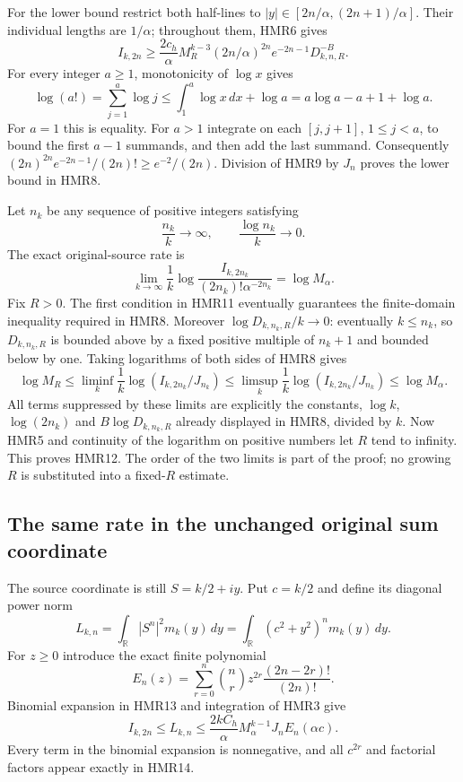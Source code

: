 \documentclass[11pt,a4paper]{article}
\begin{document}
For the lower bound restrict both half-lines to
$|y|\in[2n/\alpha,(2n+1)/\alpha]$. Their individual lengths
are $1/\alpha$; throughout them, HMR6 gives
\[
 I_{k,2n}\geq
 \frac{2c_h}{\alpha}M_R^{k-3}
       (2n/\alpha)^{2n}e^{-2n-1}D_{k,n,R}^{-B}.
 \tag{HMR9}
\]
For every integer $a\geq1$, monotonicity of $\log x$ gives
\[
 \log(a!)=\sum_{j=1}^a\log j
 \leq\int_1^a\log x\,dx+\log a
 =a\log a-a+1+\log a.
 \tag{HMR10}
\]
For $a=1$ this is equality. For $a>1$ integrate on each
$[j,j+1]$, $1\leq j<a$, to bound the first $a-1$
summands, and then add the last summand. Consequently
$(2n)^{2n}e^{-2n-1}/(2n)!\geq e^{-2}/(2n)$.
Division of HMR9 by $J_n$ proves the lower bound in HMR8.

Let $n_k$ be any sequence of positive integers satisfying
\[
 \frac{n_k}{k}\longrightarrow\infty,\qquad
 \frac{\log n_k}{k}\longrightarrow0.
 \tag{HMR11}
\]
The exact original-source rate is
\[
 \boxed{\displaystyle
 \lim_{k\to\infty}\frac1k
 \log\frac{I_{k,2n_k}}{(2n_k)!\alpha^{-2n_k}}
 =\log M_\alpha.}
 \tag{HMR12}
\]
Fix $R>0$. The first condition in HMR11 eventually guarantees
the finite-domain inequality required in HMR8.
Moreover $\log D_{k,n_k,R}/k\to0$: eventually $k\leq n_k$,
so $D_{k,n_k,R}$ is bounded above by a fixed positive
multiple of $n_k+1$ and bounded below by one.
Taking logarithms of both sides of HMR8 gives
\[
 \log M_R\leq
 \liminf_k\frac1k\log(I_{k,2n_k}/J_{n_k})
 \leq\limsup_k\frac1k\log(I_{k,2n_k}/J_{n_k})
 \leq\log M_\alpha.
\]
All terms suppressed by these limits are explicitly the
constants, $\log k$, $\log(2n_k)$ and $B\log D_{k,n_k,R}$
already displayed in HMR8, divided by $k$.
Now HMR5 and continuity of the logarithm on positive numbers
let $R$ tend to infinity. This proves HMR12. The order of the
two limits is part of the proof; no growing $R$ is substituted
into a fixed-$R$ estimate.

\subsection{The same rate in the unchanged original sum coordinate}

The source coordinate is still $S=k/2+iy$. Put $c=k/2$ and
define its diagonal power norm
\[
 L_{k,n}=\int_{\mathbb R}|S^n|^2m_k(y)\,dy
        =\int_{\mathbb R}(c^2+y^2)^n m_k(y)\,dy.
 \tag{HMR13}
\]
For $z\geq0$ introduce the exact finite polynomial
\[
 E_n(z)=\sum_{r=0}^n
   \binom nr z^{2r}\frac{(2n-2r)!}{(2n)!}.
 \tag{HMR14}
\]
Binomial expansion in HMR13 and integration of HMR3 give
\[
 I_{k,2n}\leq L_{k,n}
 \leq\frac{2kC_h}{\alpha}M_\alpha^{k-1}J_nE_n(\alpha c).
 \tag{HMR15}
\]
Every term in the binomial expansion is nonnegative, and all
$c^{2r}$ and factorial factors appear exactly in HMR14.
\end{document}
